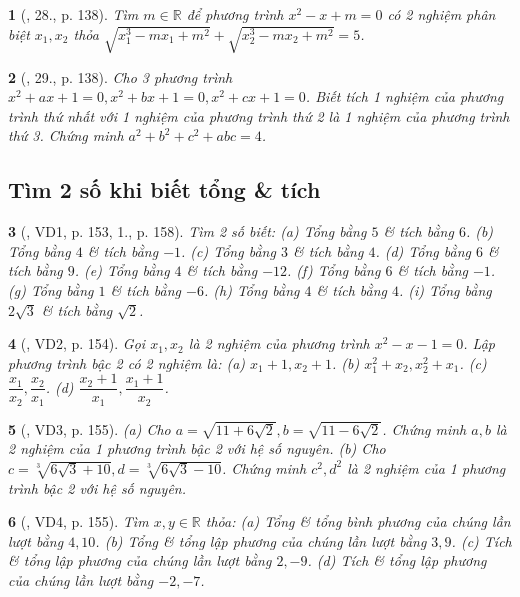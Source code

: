 \documentclass{article}
\newtheorem{baitoan}{}
\begin{document}
\begin{baitoan}[\cite{Thu_Viet_Minh_ptb2}, 28., p. 138]
	Tìm $m\in\mathbb{R}$ để phương trình $x^2 - x + m = 0$ có 2 nghiệm phân biệt $x_1,x_2$ thỏa $\sqrt{x_1^3 - mx_1 + m^2} + \sqrt{x_2^3 - mx_2 + m^2} = 5$.
\end{baitoan}

\begin{baitoan}[\cite{Thu_Viet_Minh_ptb2}, 29., p. 138]
	Cho 3 phương trình $x^2 + ax + 1 = 0,x^2 + bx + 1 = 0,x^2 + cx + 1 = 0$. Biết tích 1 nghiệm của phương trình thứ nhất với 1 nghiệm của phương trình thứ 2 là 1 nghiệm của phương trình thứ 3. Chứng minh $a^2 + b^2 + c^2 + abc = 4$.
\end{baitoan}

\subsection{Tìm 2 số khi biết tổng \& tích}

\begin{baitoan}[\cite{Thu_Viet_Minh_ptb2}, VD1, p. 153, 1., p. 158]
	Tìm 2 số biết: (a) Tổng bằng $5$ \& tích bằng $6$. (b) Tổng bằng $4$ \& tích bằng $-1$. (c) Tổng bằng $3$ \& tích bằng $4$. (d) Tổng bằng $6$ \& tích bằng $9$. (e) Tổng bằng $4$ \& tích bằng $-12$. (f) Tổng bằng $6$ \& tích bằng $-1$. (g) Tổng bằng $1$ \& tích bằng $-6$. (h) Tổng bằng $4$ \& tích bằng $4$. (i) Tổng bằng $2\sqrt{3}$ \& tích bằng $\sqrt{2}$.
\end{baitoan}

\begin{baitoan}[\cite{Thu_Viet_Minh_ptb2}, VD2, p. 154]
	Gọi $x_1,x_2$ là 2 nghiệm của phương trình $x^2 - x - 1 = 0$. Lập phương trình bậc 2 có 2 nghiệm là: (a) $x_1 + 1,x_2 + 1$. (b) $x_1^2 + x_2,x_2^2 + x_1$. (c) $\dfrac{x_1}{x_2},\dfrac{x_2}{x_1}$. (d) $\dfrac{x_2 + 1}{x_1},\dfrac{x_1 + 1}{x_2}$.
\end{baitoan}

\begin{baitoan}[\cite{Thu_Viet_Minh_ptb2}, VD3, p. 155]
	(a) Cho $a = \sqrt{11 + 6\sqrt{2}},b = \sqrt{11 - 6\sqrt{2}}$. Chứng minh $a,b$ là 2 nghiệm của 1 phương trình bậc 2 với hệ số nguyên. (b) Cho $c = \sqrt[3]{6\sqrt{3} + 10},d = \sqrt[3]{6\sqrt{3} - 10}$. Chứng minh $c^2,d^2$ là 2 nghiệm của 1 phương trình bậc 2 với hệ số nguyên.
\end{baitoan}

\begin{baitoan}[\cite{Thu_Viet_Minh_ptb2}, VD4, p. 155]
	Tìm $x,y\in\mathbb{R}$ thỏa: (a) Tổng \& tổng bình phương của chúng lần lượt bằng $4,10$. (b) Tổng \& tổng lập phương của chúng lần lượt bằng $3,9$. (c) Tích \& tổng lập phương của chúng lần lượt bằng $2,-9$. (d) Tích \& tổng lập phương của chúng lần lượt bằng $-2,-7$.
\end{baitoan}
\end{document}
